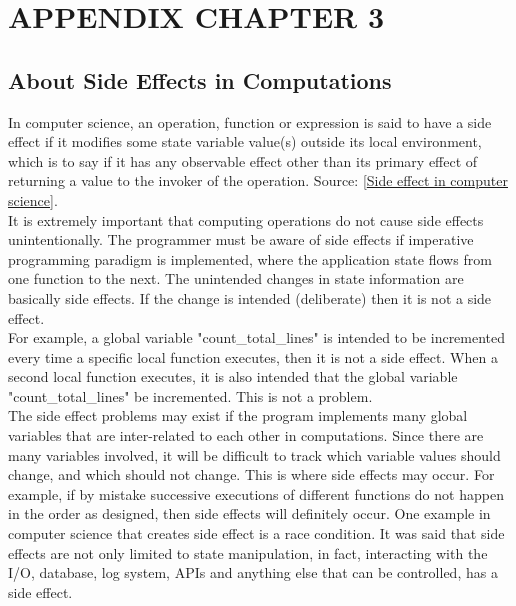 \section{APPENDIX CHAPTER 3}\label{APPENDIX CHAPTER 3}

\subsection{About Side Effects in Computations}
\label{app-Chap3-About Side Effects in Computations}


In computer science, an operation, function or expression is said to have a side effect if it modifies some state variable value(s) outside its local environment, which is to say if it has any observable effect other than its primary effect of returning a value to the invoker of the operation. Source: [\href{https://en.wikipedia.org/wiki/Side_effect_(computer_science)}{Side effect in computer science}].\\

It is extremely important that computing operations do not cause side effects unintentionally. The programmer must be aware of side effects if imperative programming paradigm is implemented, where the application state flows from one function to the next. The unintended changes in state information are basically side effects. If the change is intended (deliberate) then it is not a side effect. \\

For example, a global variable "count\_total\_lines" is intended to be incremented every time a specific local function executes, then it is not a side effect. When a second local function executes, it is also intended that the global variable "count\_total\_lines" be incremented. This is not a problem. \\

The side effect problems may exist if the program implements many global variables that are inter-related to each other in computations. Since there are many variables involved, it will be difficult to track which variable values should change, and which should not change. This is where side effects may occur. For example, if by mistake successive executions of different functions do not happen in the order as designed, then side effects will definitely occur. One example in computer science that creates side effect is a race condition. It was said that side effects are not only limited to state manipulation, in fact, interacting with the I/O, database, log system, APIs and anything else that can be controlled, has a side effect. \\

